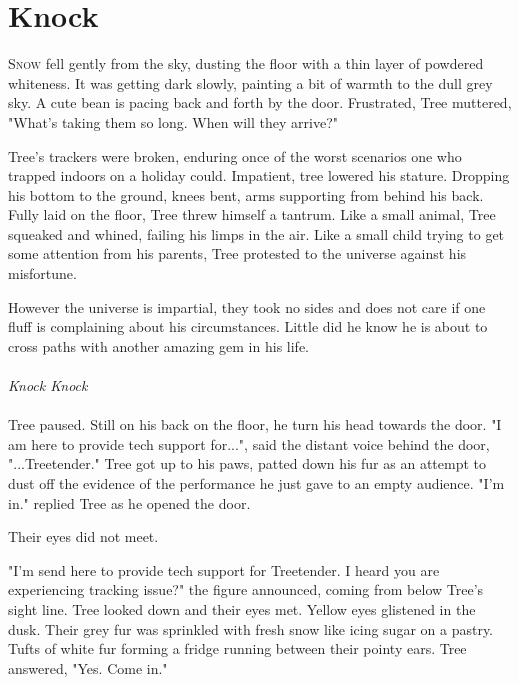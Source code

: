 

\chapter{Knock}
\lettrine{S}{now} fell gently from the sky, dusting the floor with a thin layer of powdered whiteness. It was getting dark slowly, painting a bit of warmth to the dull grey sky. A cute bean is pacing back and forth by the door. Frustrated, Tree muttered, "What's taking them so long. When will they arrive?"

Tree's trackers were broken, enduring once of the worst scenarios one who trapped indoors on a holiday could. Impatient, tree lowered his stature. Dropping his bottom to the ground, knees bent, arms supporting from behind his back. Fully laid on the floor, Tree threw himself a tantrum. Like a small animal, Tree squeaked and whined, failing his limps in the air. Like a small child trying to get some attention from his parents, Tree protested to the universe against his misfortune.

However the universe is impartial, they took no sides and does not care if one fluff is complaining about his circumstances. Little did he know he is about to cross paths with another amazing gem in his life.
\\ \\
\emph{Knock Knock}
\\ \\
Tree paused. Still on his back on the floor, he turn his head towards the door. "I am here to provide tech support for...", said the distant voice behind the door, "...Treetender." Tree got up to his paws, patted down his fur as an attempt to dust off the evidence of the performance he just gave to an empty audience. "I'm in." replied Tree as he opened the door.

Their eyes did not meet.

"I'm send here to provide tech support for Treetender. I heard you are experiencing tracking issue?" the figure announced, coming from below Tree's sight line. Tree looked down and their eyes met. Yellow eyes glistened in the dusk. Their grey fur was sprinkled with fresh snow like icing sugar on a pastry. Tufts of white fur forming a fridge running between their pointy ears. Tree answered, "Yes. Come in."
